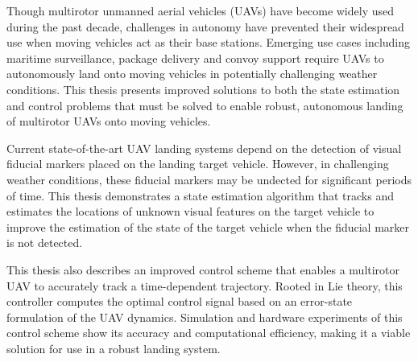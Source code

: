 \afterpage{\cleardoublepage}
Though multirotor unmanned aerial vehicles (UAVs) have become widely used 
during the past decade, challenges in autonomy have prevented their
widespread use when moving vehicles act as their base stations.
Emerging use cases including maritime
surveillance, package delivery and convoy support require UAVs to autonomously
land onto moving vehicles in potentially challenging weather
conditions. This thesis presents improved solutions to both the state estimation and
control problems that must be solved
to enable robust, autonomous landing of multirotor UAVs onto moving vehicles.

Current state-of-the-art UAV landing systems depend on the detection of visual
fiducial markers placed on the landing target vehicle. However, in challenging
weather conditions, these fiducial markers may be undected for significant
periods of time. This thesis demonstrates a state estimation algorithm that tracks
and estimates the locations of unknown visual features on the target vehicle to
improve the estimation
of the state of the target vehicle
when the fiducial marker is not detected.

This thesis also describes an improved control scheme that enables a multirotor
UAV to accurately track a time-dependent trajectory. Rooted in Lie theory, this
controller computes the optimal control signal based on an error-state
formulation of the UAV dynamics.
Simulation and hardware experiments of this control scheme show its
accuracy and computational efficiency, making it a viable solution for use in a
robust landing system.
